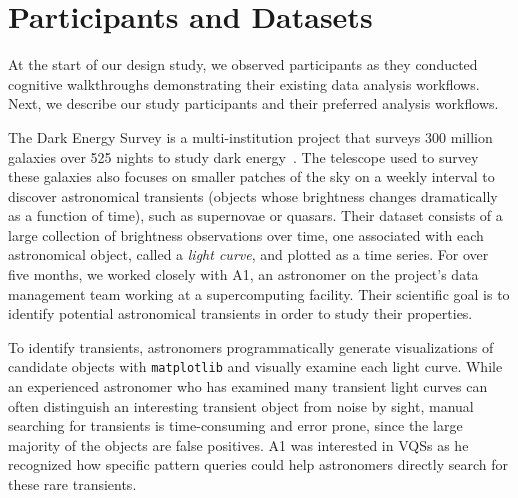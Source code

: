 \section{Participants and Datasets\label{sec:participantdatasets}}
At the start of our design study, we observed participants as they conducted cognitive walkthroughs demonstrating their existing data analysis workflows. Next, we describe our study participants and their preferred analysis workflows.%
\par\noindent{} The Dark Energy Survey is a multi-institution project that surveys 300 million galaxies over 525 nights to study dark energy~\cite{Drlica-Wagner2017}. The telescope used to survey these galaxies also focuses on smaller patches of the sky on a weekly interval to discover astronomical transients (objects whose brightness changes dramatically as a function of time), such as supernovae or quasars. Their dataset consists of a large collection of brightness observations over time, one associated with each astronomical object, called a {\em light curve}, and plotted as a time series. For over five months, we worked closely with A1, an astronomer on the project's data management team working at a supercomputing facility. Their scientific goal is to identify potential astronomical transients in order to study their properties. 
\par To identify transients, astronomers programmatically generate visualizations of candidate objects with \texttt{matplotlib} and visually examine each light curve. While an experienced astronomer who has examined many transient light curves can often distinguish an interesting transient object from noise by sight, manual searching for transients is time-consuming and error prone, since the large majority of the objects are false positives. A1 was interested in VQSs as he recognized how specific pattern queries could help astronomers directly search for these rare transients.
